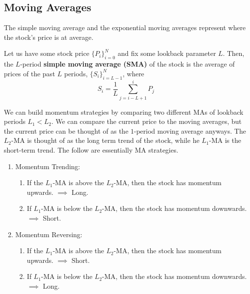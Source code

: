 \documentclass{article}
\begin{document}
  \subsection{Moving Averages}

    The simple moving average and the exponential moving averages represent where the stock's price is at average. 

    \begin{definition}
      Let us have some stock price $\{P_i\}_{i=0}^N$ and fix some lookback parameter $L$. Then, the $L$-period \textbf{simple moving average (SMA)} of the stock is the average of prices of the past $L$ periods, $\{S_i\}_{i=L-1}^N$, where 
      \[S_i = \frac{1}{L} \sum_{j=i-L + 1}^i P_j\]
    \end{definition}

    \begin{definition}

    \end{definition}

    We can build momentum strategies by comparing two different MAs of lookback periods $L_1 < L_2$. We can compare the current price to the moving averages, but the current price can be thought of as the $1$-period moving average anyways. The $L_2$-MA is thought of as the long term trend of the stock, while he $L_1$-MA is the short-term trend. The follow are essentially MA strategies. 
    \begin{enumerate}
        \item Momentum Trending: 
        \begin{enumerate}
            \item If the $L_1$-MA is above the $L_2$-MA, then the stock has momentum upwards. $\implies$ Long. 
            \item If $L_1$-MA is below the $L_2$-MA, then the stock has momentum downwards. $\implies$ Short. 
        \end{enumerate}
        
        \item Momentum Reversing: 
        \begin{enumerate}
            \item If the $L_1$-MA is above the $L_2$-MA, then the stock has momentum upwards. $\implies$ Short. 
            \item If $L_1$-MA is below the $L_2$-MA, then the stock has momentum downwards. $\implies$ Long. 
        \end{enumerate}
    \end{enumerate}
\end{document}
